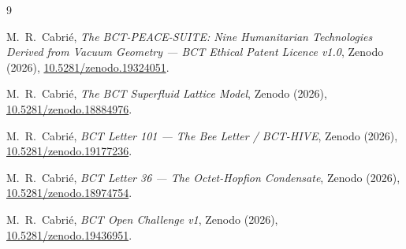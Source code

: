 \documentclass[aps,prl,twocolumn,showpacs,preprintnumbers]{revtex4-2}
\begin{document}
\begin{thebibliography}{9}

M.~R.\ Cabri\'e,
\textit{The BCT-PEACE-SUITE: Nine Humanitarian Technologies
Derived from Vacuum Geometry --- BCT Ethical Patent Licence v1.0},
Zenodo (2026),
\href{https://doi.org/10.5281/zenodo.19324051}{10.5281/zenodo.19324051}.

M.~R.\ Cabri\'e,
\textit{The BCT Superfluid Lattice Model},
Zenodo (2026),
\href{https://doi.org/10.5281/zenodo.18884976}{10.5281/zenodo.18884976}.

M.~R.\ Cabri\'e,
\textit{BCT Letter 101 --- The Bee Letter / BCT-HIVE},
Zenodo (2026),
\href{https://doi.org/10.5281/zenodo.19177236}{10.5281/zenodo.19177236}.

M.~R.\ Cabri\'e,
\textit{BCT Letter 36 --- The Octet-Hopfion Condensate},
Zenodo (2026),
\href{https://doi.org/10.5281/zenodo.18974754}{10.5281/zenodo.18974754}.

M.~R.\ Cabri\'e,
\textit{BCT Open Challenge v1},
Zenodo (2026),
\href{https://doi.org/10.5281/zenodo.19436951}{10.5281/zenodo.19436951}.

\end{thebibliography}
\end{document}
